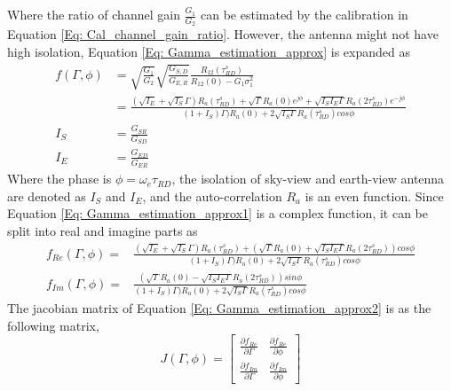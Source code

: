 \documentclass[draftcls]{IEEEtran}
\begin{document}
Where the ratio of channel gain $\frac{G_1}{G_2}$ can be estimated by the calibration in Equation \ref{Eq: Cal_channel_gain_ratio}. However, the antenna might not have high isolation, Equation \ref{Eq: Gamma_estimation_approx} is expanded as
\begin{align}
f(\Gamma, \phi)&=\sqrt{\frac{G_1}{G_2}}\sqrt{\frac{G_{S,D}}{G_{E,R}}} \frac{R_{12}(\tau^s_{RD})}{R_{12}(0)-G_1\sigma_1^2} \\
	&=\frac{(\sqrt{I_E}+\sqrt{I_S}\Gamma)R_a(\tau^s_{RD})+\sqrt{\Gamma} R_a(0)e^{j\phi}+\sqrt{I_S I_E\Gamma} R_a(2\tau^s_{RD})e^{-j\phi} }                              
                   {(1 + I_S)\Gamma)R_a(0)+2\sqrt{I_S\Gamma} R_a(\tau^s_{RD})cos\phi}  \\ 
                   I_S& = \frac{G_{SR}}{G_{SD}}\\
                   I_E& = \frac{G_{ED}}{G_{ER}}
    \label{Eq: Gamma_estimation_approx1}
\end{align}
Where   the phase is $\phi = \omega_e \tau_{RD}$, the isolation of sky-view and earth-view antenna are denoted as $I_S$ and $I_E$, and the auto-correlation $R_a$ is an even function.  Since Equation \ref{Eq: Gamma_estimation_approx1} is a complex function,  it can be split into real and imagine parts as
\begin{eqnarray}
f_{Re}(\Gamma, \phi)=&\frac{(\sqrt{I_E}+\sqrt{I_S}\Gamma)R_a(\tau^s_{RD})+(\sqrt{\Gamma} R_a(0)+\sqrt{I_S I_E\Gamma} R_a(2\tau^s_{RD}))cos\phi}                              
                   {(1 + I_S)\Gamma)R_a(0)+2\sqrt{I_S\Gamma} R_a(\tau^s_{RD})cos\phi}   \\
f_{Im}(\Gamma, \phi)=&\frac{(\sqrt{\Gamma} R_a(0)-\sqrt{I_S I_E\Gamma} R_a(2\tau^s_{RD}))sin\phi }                             
                   {(1 + I_S)\Gamma)R_a(0)+2\sqrt{I_S\Gamma} R_a(\tau^s_{RD})cos\phi}   
    \label{Eq: Gamma_estimation_approx2}
\end{eqnarray}
The jacobian matrix of Equation \ref{Eq: Gamma_estimation_approx2} is as the following matrix, 
\begin{equation}
    J(\Gamma, \phi) =
    \begin{bmatrix}
        \frac{\partial f_{Re}}{\partial \Gamma}      &  \frac{\partial f_{Re}}{\partial \phi}  \\
        \frac{\partial f_{Im}}{\partial \Gamma}      &  \frac{\partial f_{Im}}{\partial \phi}  
    \end{bmatrix} \label{Eq: Jacobian}
\end{equation}
\end{document}
